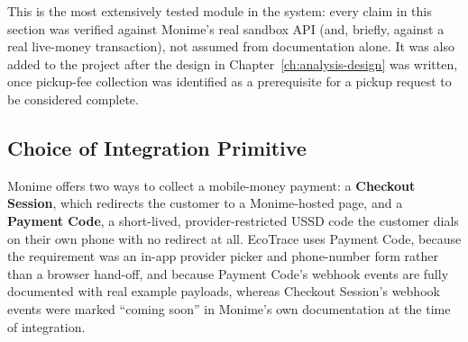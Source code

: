 This is the most extensively tested module in the system: every claim in
this section was verified against Monime's real sandbox API (and, briefly,
against a real live-money transaction), not assumed from documentation
alone. It was also added to the project after the design in
Chapter~\ref{ch:analysis-design} was written, once pickup-fee collection was
identified as a prerequisite for a pickup request to be considered complete.

\subsection{Choice of Integration Primitive}
Monime \citep{monime2026} offers two ways to collect a mobile-money
payment: a \textbf{Checkout Session}, which redirects the customer to a
Monime-hosted page, and a \textbf{Payment Code}, a short-lived,
provider-restricted USSD code the customer dials on their own phone with no
redirect at all. EcoTrace uses Payment Code, because the requirement was an
in-app provider picker and phone-number form rather than a browser
hand-off, and because Payment Code's webhook events are fully documented
with real example payloads, whereas Checkout Session's webhook events
were marked ``coming soon'' in Monime's own documentation at the time of
integration.

